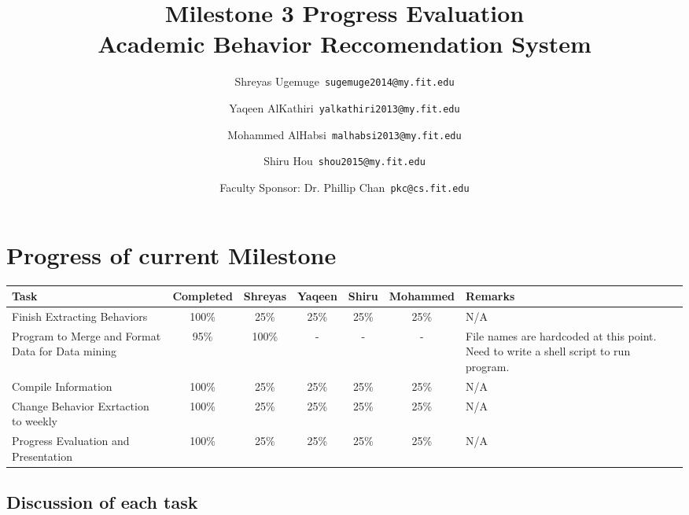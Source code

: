 \documentclass[12pt]{article}
\begin{document}
	\title{\textbf{Milestone 3 Progress Evaluation} \\ \hfill \break
	Academic Behavior Reccomendation System}
	\author{Shreyas Ugemuge\      \texttt{sugemuge2014@my.fit.edu}
  \and
  Yaqeen AlKathiri\      \texttt{yalkathiri2013@my.fit.edu}
  \and
	Mohammed AlHabsi\      \texttt{malhabsi2013@my.fit.edu}
  \and
  Shiru Hou\      \texttt{shou2015@my.fit.edu}
  \and
  Faculty Sponsor: Dr. Phillip Chan\      \texttt{pkc@cs.fit.edu}}
	\maketitle
	\pagebreak
	\singlespacing
	\tableofcontents
	\pagebreak
	\section{Progress of current Milestone}
	\begin{tabularx}{\textwidth}{|X|c|c|c|c|c|X|}
	\hline
		\textbf{Task} & \textbf{Completed} &\textbf{Shreyas} & \textbf{Yaqeen} & \textbf{Shiru} & \textbf{Mohammed} & \textbf{Remarks}  \\ \hline
		Finish Extracting Behaviors &100\% & 25\% & 25\% & 25\% & 25\% & N/A \\ \hline
		Program to Merge and Format Data for Data mining & 95\% & 100\% & - & - & - & File names are hardcoded at this point. Need to write a shell script to run program. \\ \hline
		Compile Information & 100\% & 25\% & 25\% & 25\% & 25\% & N/A \\ \hline
		Change Behavior Exrtaction to weekly & 100\% & 25\% & 25\% & 25\% & 25\% & N/A\\ \hline
		Progress Evaluation and Presentation & 100\% & 25\% & 25\% & 25\% & 25\% & N/A \\ \hline
	\end{tabularx}
	\subsection{Discussion of each task}
\end{document}
